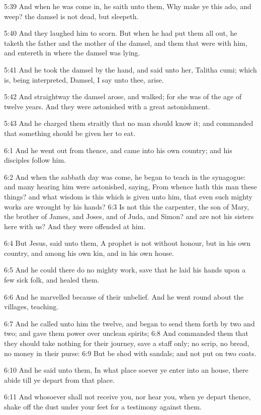 5:39 And when he was come in, he saith unto them, Why make ye this ado, and weep? the damsel is not dead, but sleepeth.

5:40 And they laughed him to scorn. But when he had put them all out, he taketh the father and the mother of the damsel, and them that were with him, and entereth in where the damsel was lying.

5:41 And he took the damsel by the hand, and said unto her, Talitha cumi; which is, being interpreted, Damsel, I say unto thee, arise.

5:42 And straightway the damsel arose, and walked; for she was of the age of twelve years. And they were astonished with a great astonishment.

5:43 And he charged them straitly that no man should know it; and commanded that something should be given her to eat.

6:1 And he went out from thence, and came into his own country; and his disciples follow him.

6:2 And when the sabbath day was come, he began to teach in the synagogue: and many hearing him were astonished, saying, From whence hath this man these things? and what wisdom is this which is given unto him, that even such mighty works are wrought by his hands?  6:3 Is not this the carpenter, the son of Mary, the brother of James, and Joses, and of Juda, and Simon? and are not his sisters here with us?  And they were offended at him.

6:4 But Jesus, said unto them, A prophet is not without honour, but in his own country, and among his own kin, and in his own house.

6:5 And he could there do no mighty work, save that he laid his hands upon a few sick folk, and healed them.

6:6 And he marvelled because of their unbelief. And he went round about the villages, teaching.

6:7 And he called unto him the twelve, and began to send them forth by two and two; and gave them power over unclean spirits; 6:8 And commanded them that they should take nothing for their journey, save a staff only; no scrip, no bread, no money in their purse: 6:9 But be shod with sandals; and not put on two coats.

6:10 And he said unto them, In what place soever ye enter into an house, there abide till ye depart from that place.

6:11 And whosoever shall not receive you, nor hear you, when ye depart thence, shake off the dust under your feet for a testimony against them.

